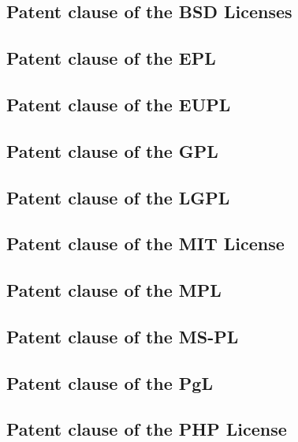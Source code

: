 \subsection{Patent clause of the BSD Licenses}

\subsection{Patent clause of the EPL}

\subsection{Patent clause of the EUPL}

\subsection{Patent clause of the GPL}

\subsection{Patent clause of the LGPL}
 
\subsection{Patent clause of the MIT License}

\subsection{Patent clause of the MPL}         

\subsection{Patent clause of the MS-PL}
  
\subsection{Patent clause of the PgL}

\subsection{Patent clause of the PHP License}



% 
